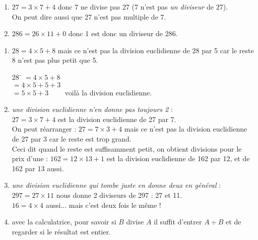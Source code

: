 \documentclass[a4paper,12pt,french]{book}
\begin{document}
\begin{exemple}[s]
	\begin{enumerate}[\textbullet]
		\item 	$27 = 3\times 7 +4$ donc 7 ne divise pas 27 (7 n'est pas \textit{un diviseur} de 27).\\
				On peut dire aussi que 27 n'est pas multiple de 7.
		\item 	$286 = 26\times 11+0$ donc 1 est donc un diviseur de 286.
	\end{enumerate}
\end{exemple}
\begin{remarque}[s]
	\begin{enumerate}[\bfseries a.]
		\item 	$28 = 4\times 5 +8$ mais ce n'est pas la division euclidienne de 28 par 5 car le \og reste\fg{} 8 n'est pas plus petit que 5.
				\begin{tabbing}
					$28$ 	\= 	$=4\times 5 + 8$\\
							\>	$=4\times 5 + 5 + 3$\\
							\>	$=5\times 5 +3\qquad$ voilà la division euclidienne.
				\end{tabbing}
		\item 	\textit{\og une division euclidienne n'en donne pas toujours 2\fg{}	} :\\
				$27 = 3\times 7 + 4$ est la division euclidienne de 27 par 7.\\
				On peut réarranger : $27 = 7\times 3 +4$ mais ce n'est pas la division euclidienne de 27 par 3  car le reste est trop grand.\\
				
				Ceci dit quand le reste est suffisamment petit, on obtient  divisions pour le prix d'une \fg{}:
				$162=12\times 13 +1$ est la division euclidienne de 162 par 12, et de 162 par 13 aussi.
				
		\item 	\textit{\og une division euclidienne qui tombe juste en donne deux en général\fg{}} :\\
				$297=27\times 11$ nous donne 2 diviseurs de 297 : 27 et 11.\\
				$16 = 4\times4$ aussi... mais c'est deux fois le même !
		\item 	avec la calculatrice, pour savoir si $B$ divise $A$ il suffit d'entrer $A\div B$ et de regarder si le résultat est entier.
	\end{enumerate}
\end{remarque}
\end{document}
